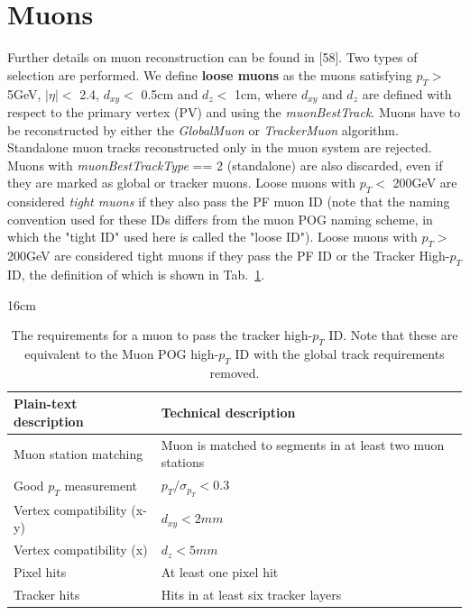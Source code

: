 \section{Muons}
Further details on muon reconstruction can be found in [58]. Two types of selection are performed. We define \textbf{loose muons} as the muons satisfying $p_{T}>$ 5GeV, $|\eta|<$ 2.4, $d_{xy}<$ 0.5cm and $d_{z}<$ 1cm, where $d_{xy}$ and $d_{z}$ are defined with respect to the primary vertex (PV) and using the \textit{muonBestTrack}. Muons have to be reconstructed by either the \textit{GlobalMuon} or \textit{TrackerMuon} algorithm. Standalone muon tracks reconstructed only in the muon system are rejected. Muons with \textit{muonBestTrackType} == 2 (standalone) are also discarded, even if they are marked as global or tracker muons. Loose muons with $p_{T}<$ 200GeV are considered \textit{tight muons} if they also pass the PF muon ID (note that the naming convention used for these IDs differs from the muon POG naming scheme, in which the "tight ID" used here is called the "loose ID"). Loose muons with $p_{T}>$ 200GeV are considered tight muons if they pass the PF ID or the Tracker High-$p_{T}$ ID, the definition of which is shown in Tab.~\ref{tab:mu_tracker_highpTID_requirements}.

\begin{table}[hbtp]{16cm}
	\caption{The requirements for a muon to pass the tracker high-$p_{T}$ ID. Note that these are equivalent to the Muon POG high-$p_{T}$ ID with the global track requirements removed.}
	\centering
	\begin{tabular}{l|p{9cm}}
		\hline
		Plain-text description     & Technical description\\
		\hline
		Muon station matching      & Muon is matched to segments in at least two muon stations\\
		Good $p_{T}$ measurement   & $p_{T}/\sigma_{p_{T}} < 0.3$\\
		Vertex compatibility (x-y) & $d_{xy} < 2mm$\\
		Vertex compatibility (x)   & $d_{z}<5mm$\\
		Pixel hits                 & At least one pixel hit\\
		Tracker hits               & Hits in at least six tracker layers\\
		\hline
	\end{tabular}
	\label{tab:mu_tracker_highpTID_requirements}
\end{table}

